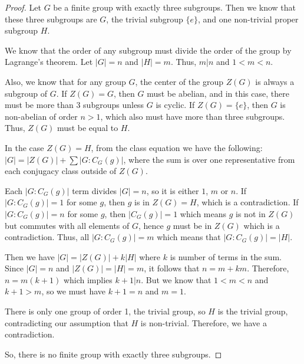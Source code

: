 \documentclass{amsart}
\theoremstyle{plain}
\begin{document}
\begin{proof}Let $G$ be a finite group with exactly three subgroups. Then we know that these three subgroups are $G$, the trivial subgroup $\{e\}$, and one non-trivial proper subgroup $H$. 

We know that the order of any subgroup must divide the order of the group by Lagrange's theorem. Let $|G|=n$ and $|H|=m$. Thus, $m|n$ and $1<m<n$.

Also, we know that for any group $G$, the center of the group $Z(G)$ is always a subgroup of $G$. If $Z(G)=G$, then $G$ must be abelian, and in this case, there must be more than 3 subgroups unless $G$ is cyclic. If $Z(G)=\{e\}$, then $G$ is non-abelian of order $n>1$, which also must have more than three subgroups. Thus, $Z(G)$ must be equal to $H$. 

In the case $Z(G)=H$, from the class equation we have the following:
$|G|=|Z(G)|+\sum |G:C_G(g)|$, where the sum is over one representative from each conjugacy class outside of $Z(G)$. 

Each $|G:C_G(g)|$ term divides $|G|=n$, so it is either $1$, $m$ or $n$. If $|G:C_G(g)|=1$ for some $g$, then $g$ is in $Z(G)=H$, which is a contradiction. If $|G:C_G(g)|=n$ for some $g$, then $|C_G(g)|=1$ which means $g$ is not in $Z(G)$ but commutes with all elements of $G$, hence $g$ must be in $Z(G)$ which is a contradiction. Thus, all $|G:C_G(g)|=m$ which means that $|G:C_G(g)|=|H|$.

Then we have $|G|=|Z(G)|+k|H|$ where $k$ is number of terms in the sum. Since $|G|=n$ and $|Z(G)|=|H|=m$, it follows that $n=m+km$. Therefore, $n=m(k+1)$ which implies $k+1|n$. But we know that $1<m<n$ and $k+1>m$, so we must have $k+1=n$ and $m=1$. 

There is only one group of order 1, the trivial group, so $H$ is the trivial group, contradicting our assumption that $H$ is non-trivial. Therefore, we have a contradiction. 

So, there is no finite group with exactly three subgroups.\end{proof}
\end{document}
